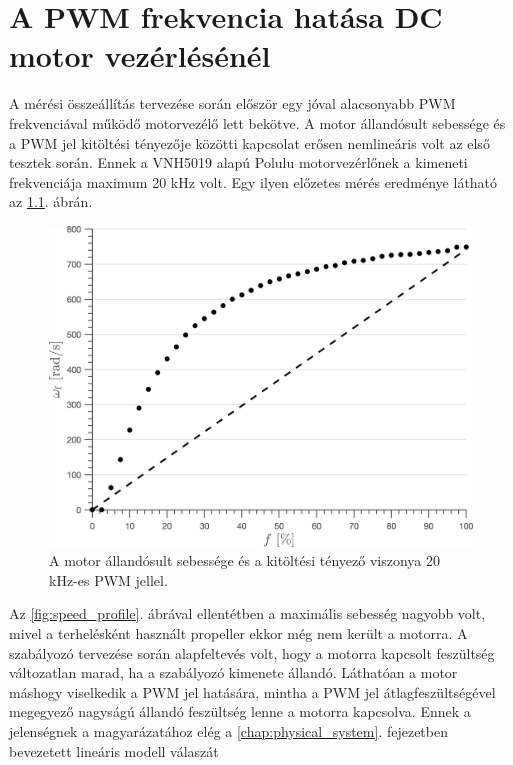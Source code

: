 \chapter{A PWM frekvencia hatása DC motor vezérlésénél}\label{chap:effects_of_pwm_frequency}
A mérési összeállítás tervezése során először egy jóval alacsonyabb PWM frekvenciával működő 
motorvezélő lett bekötve. A motor állandósult sebessége és a PWM jel kitöltési tényezője közötti kapcsolat 
erősen nemlineáris volt az első tesztek során. Ennek a VNH5019 alapú Polulu motorvezérlőnek a kimeneti frekvenciája 
maximum 20 kHz volt. Egy ilyen előzetes mérés eredménye látható az \ref{fig:motor_response_20khz}. ábrán. 
\begin{figure}[H]
    \begin{center}
    \includegraphics[width=14cm]{images/motor_pwm_response20.png}
    \caption{A motor állandósult sebessége és a kitöltési tényező viszonya 20 kHz-es PWM jellel.}\label{fig:motor_response_20khz}
    \end{center}
\end{figure}
Az \ref{fig:speed_profile}. ábrával ellentétben a maximális sebesség nagyobb volt, mivel a 
terhelésként használt propeller ekkor még nem került a motorra. A szabályozó tervezése során alapfeltevés volt, hogy 
a motorra kapcsolt feszültség változatlan marad, ha a szabályozó kimenete állandó. Láthatóan a motor máshogy viselkedik 
a PWM jel hatására, mintha a PWM jel átlagfeszültségével megegyező nagyságú állandó feszültség lenne a motorra kapcsolva.
Ennek a jelenségnek a magyarázatához elég a \ref{chap:physical_system}. fejezetben bevezetett lineáris modell válaszát 
